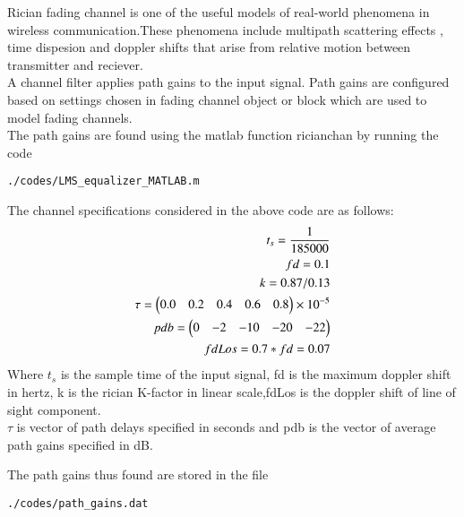Rician fading channel is one of the useful models of real-world phenomena in wireless communication.These phenomena include multipath scattering effects , time dispesion and doppler shifts that arise from relative motion between transmitter and reciever.
\\
A channel filter applies path gains to the input signal.
Path gains are configured based on settings chosen in fading channel object or block which are used to model fading channels.
\\
The path gains are found using the matlab function ricianchan by running the code 
\begin{lstlisting}
./codes/LMS_equalizer_MATLAB.m
\end{lstlisting}
The channel specifications considered in the above code are as follows:
\begin{align}
t_s=\frac{1}{185000}
\\
fd=0.1
\\
k=0.87/0.13
\\
\tau=\begin{pmatrix}0.0& 0.2& 0.4 &0.6 &0.8 \end{pmatrix}\times 10^{-5}
\\
pdb = \begin{pmatrix}0& -2& -10 &-20 & -22\end{pmatrix}
\\
fdLos=0.7*fd=0.07
\end{align}
Where $t_s$ is the sample time of the input signal, fd is the maximum doppler shift in hertz, k is the rician K-factor in linear scale,fdLos is the doppler shift of line of sight component.
\\
$\tau$ is vector of path delays specified in seconds and pdb is the vector of average path gains specified in dB.

The path gains thus found are stored in the file
\begin{lstlisting}
./codes/path_gains.dat
\end{lstlisting}
